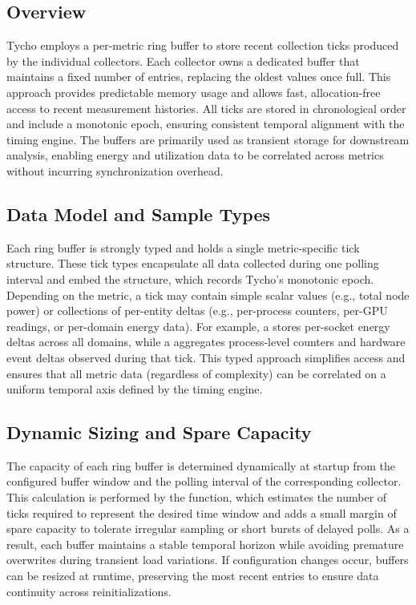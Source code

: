 \subsection{Overview}
\label{subsec:ringbuffer_overview}

Tycho employs a per-metric ring buffer to store recent collection ticks produced by the individual collectors.
Each collector owns a dedicated buffer that maintains a fixed number of entries, replacing the oldest values once full.
This approach provides predictable memory usage and allows fast, allocation-free access to recent measurement histories.
All ticks are stored in chronological order and include a monotonic epoch, ensuring consistent temporal alignment with the timing engine.
The buffers are primarily used as transient storage for downstream analysis, enabling energy and utilization data to be correlated across metrics without incurring synchronization overhead.

\subsection{Data Model and Sample Types}
\label{subsec:ringbuffer_samples}

Each ring buffer is strongly typed and holds a single metric-specific tick structure.
These tick types encapsulate all data collected during one polling interval and embed the  structure, which records Tycho’s monotonic epoch.
Depending on the metric, a tick may contain simple scalar values (e.g., total node power) or collections of per-entity deltas (e.g., per-process counters, per-GPU readings, or per-domain energy data).
For example, a  stores per-socket energy deltas across all domains, while a  aggregates process-level counters and hardware event deltas observed during that tick.
This typed approach simplifies access and ensures that all metric data (regardless of complexity) can be correlated on a uniform temporal axis defined by the timing engine.

\subsection{Dynamic Sizing and Spare Capacity}
\label{subsec:ringbuffer_sizing}

The capacity of each ring buffer is determined dynamically at startup from the configured buffer window and the polling interval of the corresponding collector.
This calculation is performed by the  function, which estimates the number of ticks required to represent the desired time window and adds a small margin of spare capacity to tolerate irregular sampling or short bursts of delayed polls.
As a result, each buffer maintains a stable temporal horizon while avoiding premature overwrites during transient load variations.
If configuration changes occur, buffers can be resized at runtime, preserving the most recent entries to ensure data continuity across reinitializations.

